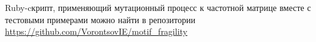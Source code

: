 \documentclass[a4paper]{article}
\begin{document}





Ruby-cкрипт, применяющий мутационный процесс к частотной матрице вместе с тестовыми примерами можно найти в репозитории \url{https://github.com/VorontsovIE/motif_fragility}
\end{document}
